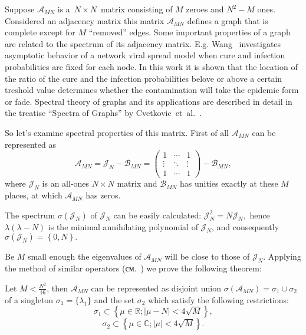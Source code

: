 Suppose
    \( \mathscr{A}_{MN} \)
    is a~\( N\times N \)~matrix
    consisting of \( M \) zeroes and \( N^2 - M \) ones.
Considered an adjacency matrix this matrix \( \mathscr{A}_{MN} \)
    defines a graph that is complete except for \( M \) ``removed'' edges.
Some important properties of a graph are related to the spectrum
    of its adjacency matrix.
E.g. Wang~\cite{epidemic} investigates asymptotic behavior
    of a network viral spread model
    when cure and infection probabilities are fixed for each node.
In this work it is shown that the location of the ratio
    of the cure and the infection probabilities
    belove or above a certain treshold value
    determines whether the contamination will take the epidemic form
    or fade.
Spectral theory of graphs and its applications are described in detail
    in the treatise ``Spectra of Graphs'' by Cvetkovic~et~al.~\cite{cvet}.

So let's examine spectral properties of this matrix.
First of all \( \mathscr{A}_{MN} \) can be represented as
\[ \mathscr{A}_{MN} = \mathcal{J}_N - \mathscr{B}_{MN} =
    \begin{pmatrix}1 & \cdots & 1\\ \vdots & \ddots & \vdots \\ 1 & \cdots & 1\end{pmatrix} - \mathscr{B}_{MN}, \]
    where \( \mathcal{J}_N \) is an all-ones \( N\times N \) matrix
    and \( \mathscr{B}_{MN} \) has unities exactly at these \( M \) places,
    at which \( \mathscr{A}_{MN} \) has zeros.

The spectrum \( \sigma\left( \mathcal{J}_N \right) \)
 of \( \mathcal{J}_N \) can be easily calculated:
 \( \mathcal{J}_N^2 = N \mathcal{J}_N, \) hence
 \( \lambda(\lambda - N) \) is the minimal annihilating polynomial of \( \mathcal{J}_N \),
 and consequently
 \( \sigma\left( \mathcal{J}_N \right) = \left\{ 0,N \right\}. \)

Be \( M \) small enough
    the eigenvalues of \( \mathscr{A}_{MN} \) will be close to those of \( \mathcal{J}_N \).
Applying the method of similar operators (см.~\cite{baskakov-harmonic,baskakov-split})
    we prove the following theorem:
\begin{thm}\label{kozlukovsv:thm:almost-all-ones}
    Let \( M < \frac{N^2}{16} \),
    then \( \mathscr{A}_{MN} \) can be represented as disjoint union
    \( \sigma\left(\mathscr{A}_{MN}\right) = \sigma_1 \cup \sigma_2 \)
    of a singleton \( \sigma_1=\{\lambda_1\} \)
    and the set \( \sigma_2 \) which satisfy the following restrictions:
    \[ \sigma_1 \subset \left\{ \mu\in\mathbb{R}; \lvert \mu - N \rvert < 4\sqrt{M} \right\}, \]
    \[ \sigma_2 \subset \left\{ \mu\in\mathbb{C}; \lvert \mu \rvert < 4\sqrt{M} \right\}. \]
\end{thm}
